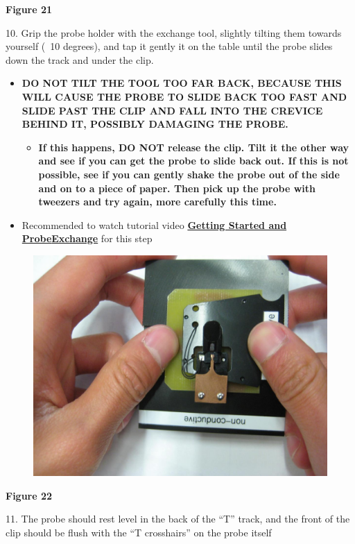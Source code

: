 \documentclass{../lab}
\begin{document}
\textbf{Figure 21}

10.  Grip the probe holder with the exchange tool, slightly tilting them towards yourself (~10 degrees), and tap it gently it on the table until the probe slides down the track and under the clip.

\begin{itemize}
    \item \textbf{DO NOT TILT THE TOOL TOO FAR BACK, BECAUSE THIS WILL CAUSE THE PROBE TO SLIDE BACK TOO FAST AND SLIDE PAST THE CLIP AND FALL INTO THE CREVICE BEHIND IT, POSSIBLY DAMAGING THE PROBE.}
    \begin{itemize}
        \item \textbf{If this happens, DO NOT release the clip. Tilt it the other way and see if you can get the probe to slide back out.  If this is not possible, see if you can gently shake the probe out of the side and on to a piece of paper. Then pick up the probe with tweezers and try again, more carefully this time.}

    \end{itemize}

    \item Recommended to watch tutorial video \href{http://experimentationlab.berkeley.edu/sites/default/files/gettingstarted\_final2.mp4}{\textbf{Getting Started and Probe}}\href{http://experimentationlab.berkeley.edu/sites/default/files/gettingstarted\_final2.mp4}{\textbf{Exchange}} for this step

\end{itemize}


\begin{figure}[h]
    \centering
    \href{http://experimentationlab.berkeley.edu/sites/default/files/AFMImages/22.JPG}{\includegraphics[width=0.5\linewidth]{images/22.JPG}}
    \caption{}
    \label{fig:22}
\end{figure}

\textbf{Figure 22}

11.  The probe should rest level in the back of the ``T'' track, and the front of the clip should be flush with the ``T crosshairs'' on the probe itself
\end{document}
